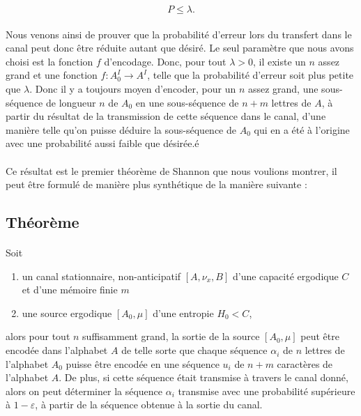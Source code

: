 	\[P\le \lambda.\]
	
	\paragraph{}Nous venons ainsi de prouver que la probabilité d'erreur lors 
	du transfert dans le canal peut donc être réduite autant que désiré.
	Le seul paramètre que nous avons choisi est la fonction $f$ d'encodage.
	Donc, pour tout $\lambda >0$, il existe un $n$ assez grand et
	une fonction $f : A_0^I \to A^I$, telle que la probabilité d'erreur 
	soit plus petite que $\lambda$. Donc il y a toujours moyen d'encoder,
	pour un $n$ assez grand, une sous-séquence de longueur $n$ de $A_0$ 
	en une sous-séquence de $n+m$ lettres de $A$, à partir du résultat 
	de la transmission de cette séquence dans le canal, d'une manière telle
	qu'on puisse déduire la sous-séquence de $A_0$ qui en a été à l'origine 
	avec une probabilité aussi faible que désirée.é
	
	\paragraph{}
	Ce résultat est le premier théorème de Shannon que nous voulions montrer,
	il peut être formulé de manière plus synthétique de la manière suivante :
	
\subsection*{Théorème}
	
	\paragraph{}
	Soit 
	\begin{enumerate}
		\item un canal stationnaire, non-anticipatif $[A,\nu_x,B]$ d'une 
			capacité ergodique $C$ et d'une mémoire finie $m$
		\item une source ergodique $[A_0,\mu]$ d'une entropie $H_0<C$,
	\end{enumerate}
	alors pour tout $n$ suffisamment grand, la sortie de la source
	$[A_0,\mu]$ peut être encodée dans l'alphabet $A$ de telle sorte que
	chaque séquence $\alpha_i$ de $n$ lettres de l'alphabet $A_0$ puisse
	être encodée en une séquence $u_i$ de $n+m$ caractères de l'alphabet $A$. 
	De plus, si cette séquence était transmise à travers le canal donné, alors
	on peut déterminer la séquence $\alpha_i$ transmise avec une probabilité 
	supérieure à $1-\varepsilon$, à partir de la séquence obtenue à la sortie 
	du canal.
	
